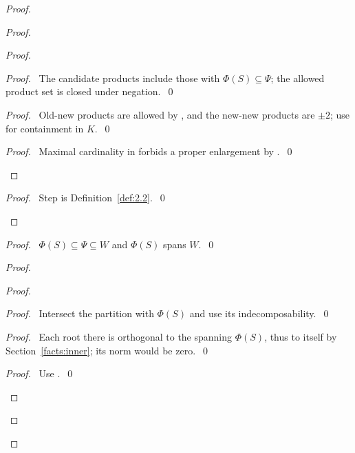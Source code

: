 \begin{proof}
 \begin{proof}
  \begin{proof}
   \begin{proof}\pf\ The candidate products include those with $\Phi(S)\subseteq\Psi$;
    the allowed product set is closed under negation.~\qed\end{proof}
   \begin{proof}\pf\ Old-new products are allowed by , and the new-new
    products are $\pm2$; use  for containment in $K$.~\qed\end{proof}
   \qedstep
   \begin{proof}\pf\ Maximal cardinality in  forbids a proper
    enlargement by .~\qed\end{proof}
  \end{proof}
  \qedstep
  \begin{proof}\pf\ Step  is Definition~\ref{def:2.2}.~\qed\end{proof}
 \end{proof}
 \begin{proof}\pf\ $\Phi(S)\subseteq\Psi\subseteq W$ and $\Phi(S)$ spans $W$.~\qed\end{proof}
 \begin{proof}
  \begin{proof}
   \begin{proof}\pf\ Intersect the partition with $\Phi(S)$ and use its indecomposability.~\qed\end{proof}
   \begin{proof}\pf\ Each root there is orthogonal to the spanning $\Phi(S)$,
    thus to itself by Section~\ref{facts:inner}; its norm would be zero.~\qed\end{proof}
   \qedstep
   \begin{proof}\pf\ Use .~\qed\end{proof}
  \end{proof}

\end{proof}
\end{proof}
